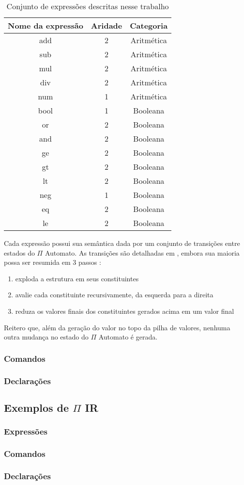 \begin{table}[]
    \centering
    \begin{tabular}{|c|c|c|}
    \hline
         Nome da expressão & Aridade & Categoria\\\hline\hline
         add & 2 & Aritmética\\\hline
         sub & 2 & Aritmética\\\hline
         mul & 2 & Aritmética\\\hline
         div & 2 & Aritmética\\\hline
         num & 1 & Aritmética\\\hline
         bool & 1 & Booleana\\\hline
         or & 2 & Booleana\\\hline
         and & 2 & Booleana\\\hline
         ge & 2 & Booleana\\\hline
         gt & 2 & Booleana\\\hline
         lt & 2 & Booleana\\\hline
         neg & 1 & Booleana\\\hline
         eq & 2 & Booleana\\\hline
         le & 2 & Booleana\\\hline
    \hline
    \end{tabular}
    \caption{Conjunto de expressões descritas nesse trabalho}
    \label{tab:expressoes}
\end{table}

Cada expressão possui sua semântica dada por um conjunto de transições entre estados do $\Pi$ Automato. As transições são detalhadas em \cite{Transicoes}, embora sua maioria possa ser resumida em 3 passos : 
\begin{enumerate}
    \item exploda a estrutura em seus constituintes
    \item avalie cada constituinte recursivamente, da esquerda para a direita
    \item reduza os valores finais dos constituintes gerados acima em um valor final
\end{enumerate}
Reitero que, além da geração do valor no topo da pilha de valores, nenhuma outra mudança no estado do $\Pi$ Automato é gerada. 
\subsubsection{Comandos}
\subsubsection{Declarações}

\subsection{Exemplos de $\Pi$ IR}
\subsubsection{Expressões}
\subsubsection{Comandos}
\subsubsection{Declarações}\label{declarações}